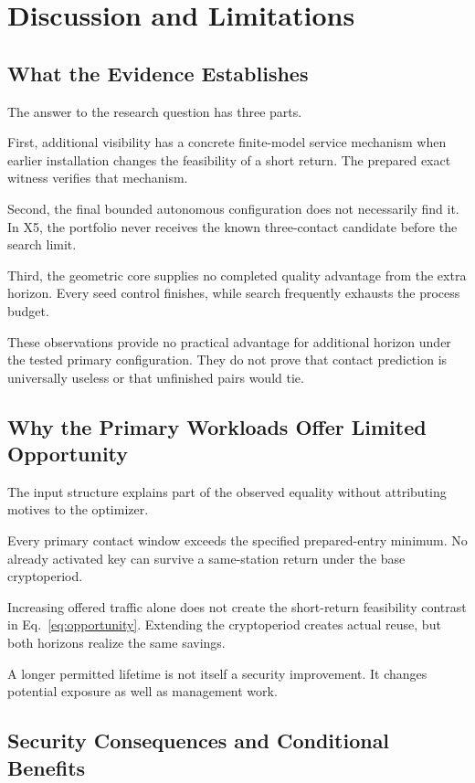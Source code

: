 \documentclass[conference]{IEEEtran}
\begin{document}
\section{Discussion and Limitations}
\label{sec:discussion}

\subsection{What the Evidence Establishes}

The answer to the research question has three parts.

First, additional visibility has a concrete finite-model
service mechanism when earlier installation changes the
feasibility of a short return.
The prepared exact witness verifies that mechanism.

Second, the final bounded autonomous configuration does not
necessarily find it.
In X5, the portfolio never receives the known three-contact
candidate before the search limit.

Third, the geometric core supplies no completed quality
advantage from the extra horizon.
Every seed control finishes, while search frequently exhausts
the process budget.

These observations provide no practical advantage for additional
horizon under the tested primary configuration.
They do not prove that contact prediction is universally
useless or that unfinished pairs would tie.

\subsection{Why the Primary Workloads Offer Limited Opportunity}

The input structure explains part of the observed equality
without attributing motives to the optimizer.

Every primary contact window exceeds the specified
prepared-entry minimum.
No already activated key can survive a same-station return
under the base cryptoperiod.

Increasing offered traffic alone does not create the short-return
feasibility contrast in Eq.~\eqref{eq:opportunity}.
Extending the cryptoperiod creates actual reuse, but both
horizons realize the same savings.

A longer permitted lifetime is not itself a security
improvement.
It changes potential exposure as well as management work.

\subsection{Security Consequences and Conditional Benefits}
\end{document}

